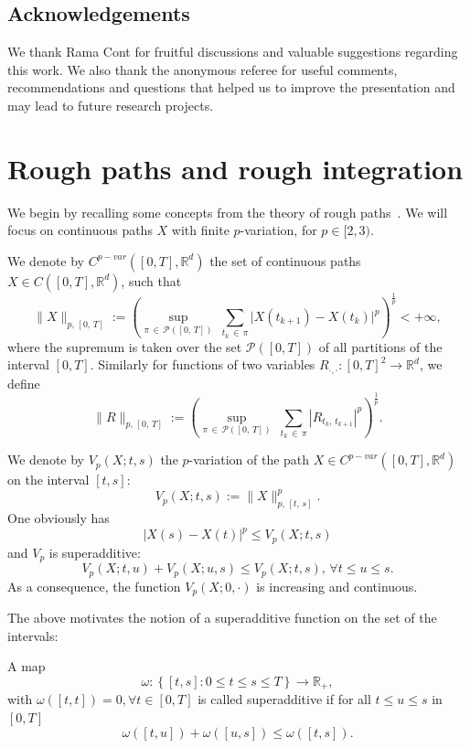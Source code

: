 \documentclass[AHL,Unicode,longabstracts,published]{cedram}
\newcommand{\calP}{\mathcal{P}}
\newcommand{\Rr}{{\mathbb{R}}}
\let\oldforall\forall
\renewcommand*{\forall}{\mathrel{\oldforall}}
\begin{document}
\subsection*{Acknowledgements}
We thank Rama Cont for fruitful discussions and valuable suggestions regarding this work. We also thank the anonymous referee for useful comments, recommendations and questions that helped us to improve the presentation and may lead to future research projects.


\section{Rough paths and rough integration}\label{chp:introrough}


We begin by recalling some concepts from the theory of rough paths~\cite{frizhairer,lyons2007,lyons98}. We will focus on continuous paths $X$ with finite $p$-variation, for $p\in [2, 3)$.

\begin{defi}
We denote by $C^{p-var}([0,T],\Rr^d)$ the set of continuous paths $X\in C([0,T], \Rr^d)$, such that
\[
\|X\|_{p,\,[0,\,T]}:=
\left(\sup_{\pi\,\in\,\calP\left([0,\,T]\right)}\;\sum_{t_k\,\in\,\pi} \big|X\left(t_{k+1}\right)-X\left(t_k\right)\big|^p\right)^{\frac 1 p}<+\infty,
\]
where the supremum is taken over the set $\calP([0,T])$ of all partitions of the interval $[0,T].$ Similarly for functions of two variables $R_{\cdot, \cdot}\colon[0,T]^2\to \Rr^d$, we define
\[
\|R\|_{p,\,\left[0,\,T\right]}:=\left(\sup_{\pi\,\in\,\calP\left([0,\,T]\right)}\;\sum_{t_k\,\in\,\pi} \left|R_{t_k,\,t_{k+1}}\right|^p\right)^{\frac 1 p}.
\]
\end{defi}

We denote by $V_p(X;t,s)$ the $p$-variation of the path ${X\in}C^{p-var}([0,T],\Rr^d)$ on the interval $[t,s]$:
\[
V_p(X;t,s):=\|X\|^p_{p,\,[t,\,s]}.
\]
One obviously has
\begin{equation}\label{chp2ieq:varholder}
\left|X(s)-X(t)\right|^p\leq V_p(X; t, s)
\end{equation}
and $V_p$ is superadditive:
\begin{equation}\label{chp2ieq:varadditive}
V_p(X; t,u)+V_p(X; u,s)\leq V_p(X;t,s),\, \forall t\leq u\leq s.
\end{equation}
As a consequence, the function $V_p(X; 0, \cdot)$ is increasing and continuous.

The above motivates the notion of a superadditive function on the set of the intervals:
\begin{defi}
A map
\[
\omega\colon\left\{ [t,s]\colon 0\leq t\leq s\leq T \right\}\to \Rr_+,
\]
with $\omega([t,t])=0, \forall t\in[0,T]$ is called superadditive if for all $t\leq u\leq s$ in $[0, T]$
\[
\omega([t,u])+\omega([u,s])\leq \omega([t,s]).
\]
\end{defi}
\end{document}
